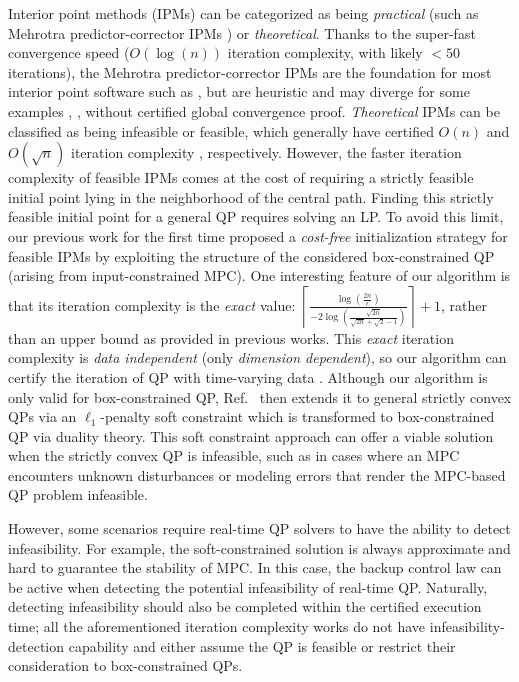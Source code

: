 Interior point methods (IPMs) can be categorized as being \textit{practical} (such as Mehrotra predictor-corrector IPMs \cite{mehrotra1992implementation}) or \textit{theoretical}. Thanks to the super-fast convergence speed ($O(\log(n))$ iteration complexity, with likely $<50$ iterations), the Mehrotra predictor-corrector IPMs are the foundation for most interior point software such as \cite{zanelli2020forces}, but are heuristic and may diverge for some examples \cite[see p.\ 411]{nocedal2006numerical}, \cite{cartis2009some}, without certified global convergence proof. \textit{Theoretical} IPMs can be classified as being infeasible or feasible, which generally have certified $O(n)$ and $O(\sqrt{n})$ iteration complexity \cite{wright1997primal,ye2011interior}, respectively. However, the faster iteration complexity of feasible IPMs comes at the cost of requiring a strictly feasible initial point lying in the neighborhood of the central path. Finding this strictly feasible initial point for a general QP requires solving an LP. To avoid this limit, our previous work \cite{wu2023direct} for the first time proposed a \textit{cost-free} initialization strategy for feasible IPMs by exploiting the structure of the considered box-constrained QP (arising from input-constrained MPC). One interesting feature of our algorithm \cite{wu2023direct} is that its iteration complexity is the \textit{exact} value: $
\!\left\lceil\frac{\log(\frac{2n}{\epsilon})}{-2\log(\frac{\sqrt{2n}}{\sqrt{2n}+\sqrt{2}-1})}\right\rceil \! + 1
$, rather than an upper bound as provided in previous works. This \textit{exact} iteration complexity is \textit{data independent} (only \textit{dimension dependent}), so our algorithm can certify the iteration of QP with time-varying data \cite{wu2024execution}. Although our algorithm \cite{wu2023direct} is only valid for box-constrained QP, Ref.\ \cite{wu2024parallel} then extends it to general strictly convex QPs via an $\ell_1$-penalty soft constraint which is transformed to box-constrained QP via duality theory. This soft constraint approach can offer a viable solution when the strictly convex QP is infeasible, such as in cases where an MPC encounters unknown disturbances or modeling errors that render the MPC-based QP problem infeasible.

However, some scenarios require real-time QP solvers to have the ability to detect infeasibility. For example, the soft-constrained solution is always approximate and hard to guarantee the stability of MPC. In this case, the backup control law can be active when detecting the potential infeasibility of real-time QP. Naturally, detecting infeasibility should also be completed within the certified execution time; all the aforementioned iteration complexity works \cite{richter2011computational, giselsson2012execution, patrinos2013accelerated, cimini2017exact, arnstrom2019exact, cimini2019complexity,arnstrom2020complexity, arnstrom2021unifying, okawa2021linear, wu2023direct, wu2024time, wu2024execution} do not have infeasibility-detection capability and either assume the QP is feasible or restrict their consideration to box-constrained QPs. 

